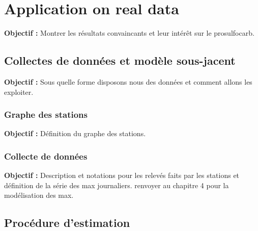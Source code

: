 \documentclass[12pt, twoside]{report}
\begin{document}


\chapter{Application on real data}

\textbf{Objectif :} Montrer les résultats convaincants et leur intérêt sur le prosulfocarb.  

\section{Collectes de données et modèle sous-jacent}

\textbf{Objectif :} Sous quelle forme disposons nous des données et comment allons les exploiter. 

\subsection{Graphe des stations}

\textbf{Objectif :} Définition du graphe des stations.

\subsection{Collecte de données}

\textbf{Objectif :} Description et notations pour les relevés faits par les stations et définition de la série des max journaliers. renvoyer au chapitre 4 pour la modélisation des max.



\section{Procédure d'estimation}
\end{document}

